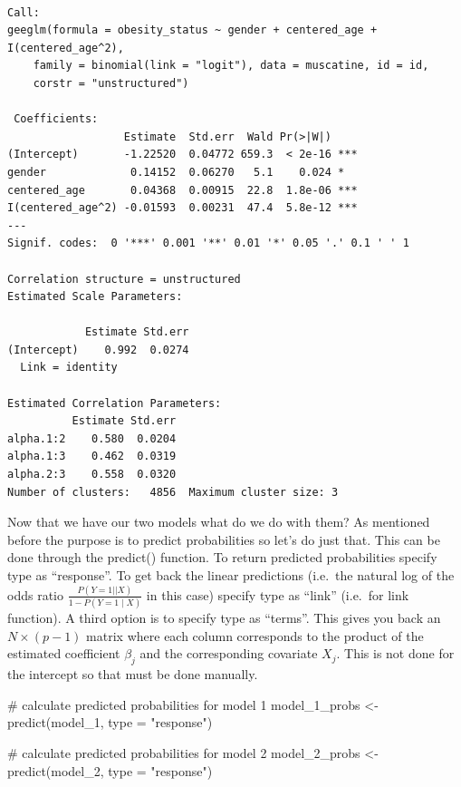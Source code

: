 \documentclass[
  letterpaper,
  DIV=11,
  numbers=noendperiod]{scrreprt}
\newenvironment{Shaded}{\begin{snugshade}}{\end{snugshade}}
\newcommand{\AttributeTok}[1]{\textcolor[rgb]{0.40,0.45,0.13}{#1}}
\newcommand{\CommentTok}[1]{\textcolor[rgb]{0.37,0.37,0.37}{#1}}
\newcommand{\FunctionTok}[1]{\textcolor[rgb]{0.28,0.35,0.67}{#1}}
\newcommand{\NormalTok}[1]{\textcolor[rgb]{0.00,0.23,0.31}{#1}}
\newcommand{\OtherTok}[1]{\textcolor[rgb]{0.00,0.23,0.31}{#1}}
\newcommand{\StringTok}[1]{\textcolor[rgb]{0.13,0.47,0.30}{#1}}
\begin{document}
\begin{verbatim}

Call:
geeglm(formula = obesity_status ~ gender + centered_age + I(centered_age^2), 
    family = binomial(link = "logit"), data = muscatine, id = id, 
    corstr = "unstructured")

 Coefficients:
                  Estimate  Std.err  Wald Pr(>|W|)    
(Intercept)       -1.22520  0.04772 659.3  < 2e-16 ***
gender             0.14152  0.06270   5.1    0.024 *  
centered_age       0.04368  0.00915  22.8  1.8e-06 ***
I(centered_age^2) -0.01593  0.00231  47.4  5.8e-12 ***
---
Signif. codes:  0 '***' 0.001 '**' 0.01 '*' 0.05 '.' 0.1 ' ' 1

Correlation structure = unstructured 
Estimated Scale Parameters:

            Estimate Std.err
(Intercept)    0.992  0.0274
  Link = identity 

Estimated Correlation Parameters:
          Estimate Std.err
alpha.1:2    0.580  0.0204
alpha.1:3    0.462  0.0319
alpha.2:3    0.558  0.0320
Number of clusters:   4856  Maximum cluster size: 3 
\end{verbatim}

Now that we have our two models what do we do with them? As mentioned
before the purpose is to predict probabilities so let's do just that.
This can be done through the predict() function. To return predicted
probabilities specify type as ``response''. To get back the linear
predictions (i.e.~the natural log of the odds ratio
\(\frac{P(Y=1| \mid X)}{1-P(Y=1 \mid X)}\) in this case) specify type as
``link'' (i.e.~for link function). A third option is to specify type as
``terms''. This gives you back an \(N \times (p-1)\) matrix where each
column corresponds to the product of the estimated coefficient
\(\beta_j\) and the corresponding covariate \(X_j\). This is not done
for the intercept so that must be done manually.

\begin{Shaded}
\begin{Highlighting}[]
\CommentTok{\# calculate predicted probabilities for model 1}
\NormalTok{model\_1\_probs }\OtherTok{\textless{}{-}} \FunctionTok{predict}\NormalTok{(model\_1, }\AttributeTok{type =} \StringTok{"response"}\NormalTok{)}

\CommentTok{\# calculate predicted probabilities for model 2}
\NormalTok{model\_2\_probs }\OtherTok{\textless{}{-}} \FunctionTok{predict}\NormalTok{(model\_2, }\AttributeTok{type =} \StringTok{"response"}\NormalTok{)}
\end{Highlighting}
\end{Shaded}
\end{document}
